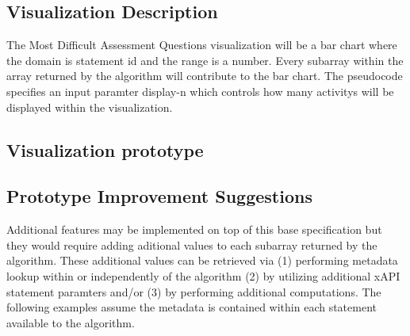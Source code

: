 \documentclass{article}
\begin{document}
\subsection{Visualization Description}
The Most Difficult Assessment Questions visualization will be a bar
chart where the domain is statement id and the range is a
number. Every subarray within the array returned by the algorithm will
contribute to the bar chart. The pseudocode specifies an input
paramter display-n which controls how many activitys will be displayed
within the visualization.

\subsection{Visualization prototype}



\subsection{Prototype Improvement Suggestions}
Additional features may be implemented on top of this base
specification but they would require adding aditional values to each
subarray returned by the algorithm. These additional values can be
retrieved via (1) performing metadata lookup within or independently of the
algorithm (2) by utilizing additional xAPI statement paramters and/or (3) by
performing additional computations. The following examples assume the
metadata is contained within each statement available to the algorithm.
\end{document}
